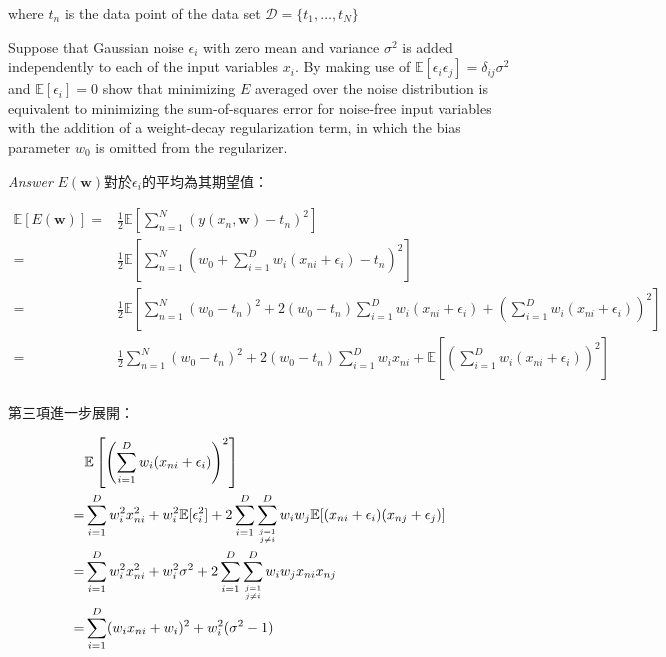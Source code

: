 \documentclass{article}
\begin{document}
where $t_n$ is the data point of the data set $\mathcal D=\{t_1, \ldots,t_N \}$

Suppose that Gaussian noise $\epsilon_i$ with zero mean and variance $\sigma^2$ is added independently to each of the input variables $x_i$.
By making use of $\mathbb E[\epsilon_i \epsilon_j] = \delta_{ij} \sigma^2$ and $\mathbb E[\epsilon_i] = 0$ show that minimizing $E$ averaged over the noise distribution is equivalent to minimizing the sum-of-squares error for noise-free input variables with the addition of a weight-decay regularization term, in which the bias parameter $w_0$ is omitted from the regularizer.

\emph{Answer} $E(\mathbf w)$對於$\epsilon_i$的平均為其期望值：

\begin{equation}
\begin{aligned}
\mathbb E[E(\mathbf w)]
=& \frac{1}{2}\mathbb E\left[\sum\limits_{n=1}^N (y(x_n, \mathbf w)-t_n)^2\right]\\
=& \frac{1}{2}\mathbb E\left[\sum\limits_{n=1}^N \left(w_0+\sum\limits_{i=1}^D w_i(x_{ni}+\epsilon_i)-t_n\right)^2\right]\\
=& \frac{1}{2}\mathbb E\left[\sum\limits_{n=1}^N (w_0-t_n)^2+2(w_0-t_n)\sum\limits_{i=1}^D w_i(x_{ni}+\epsilon_i)+\left(\sum\limits_{i=1}^D w_i(x_{ni}+\epsilon_i)\right)^2\right]\\
=& \frac{1}{2}\sum\limits_{n=1}^N (w_0-t_n)^2+2(w_0-t_n)\sum\limits_{i=1}^D w_i x_{ni}+\mathbb E\left[\left(\sum\limits_{i=1}^D w_i(x_{ni}+\epsilon_i)\right)^2\right]\\
\end{aligned}
\end{equation}

第三項進一步展開：

\begin{equation}
\begin{aligned}
& \mathbb E\left[\left(\sum\limits_{i=1}^D w_i(x_{ni}+\epsilon_i)\right)^2\right]\\
=& \sum\limits_{i=1}^D w_i^2 x_{ni}^2 + w_i^2 \mathbb E[\epsilon_i^2] + 2\sum\limits_{i=1}^D \sum\limits_{\genfrac{}{}{0pt}{2}{j=1}{j\neq i}}^D w_i w_j \mathbb E[(x_{ni}+\epsilon_i)(x_{nj}+\epsilon_j)] \\
=& \sum\limits_{i=1}^D w_i^2 x_{ni}^2 + w_i^2 \sigma^2 + 2\sum\limits_{i=1}^D \sum\limits_{\genfrac{}{}{0pt}{2}{j=1}{j\neq i}}^D w_i w_j x_{ni} x_{nj} \\
=& \sum\limits_{i=1}^D (w_i x_{ni} + w_i)^2 + w_i^2(\sigma^2-1)
\end{aligned}
\end{equation}
\end{document}
